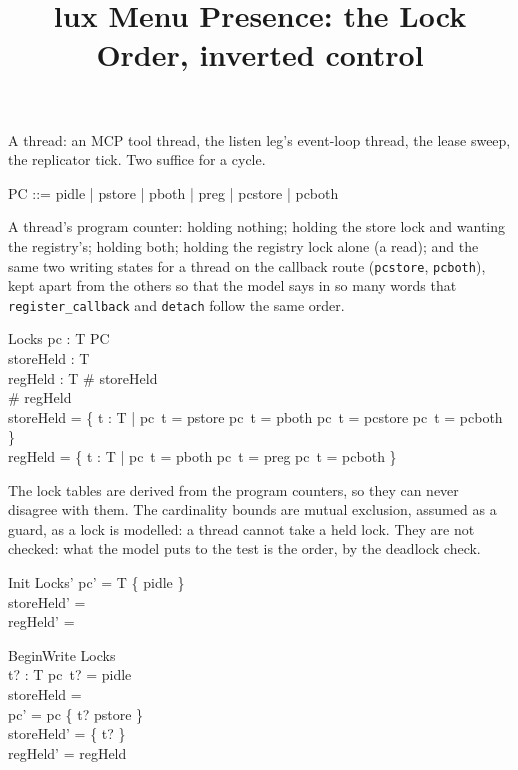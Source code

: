 \documentclass[a4paper,10pt,fleqn]{article}
\begin{document}
\title{lux Menu Presence: the Lock Order, inverted control}
\maketitle

\begin{zed}
  [T]
\end{zed}

A thread: an MCP tool thread, the listen leg's event-loop thread, the lease
sweep, the replicator tick. Two suffice for a cycle.

\begin{zed}
  PC ::= pidle | pstore | pboth | preg | pcstore | pcboth
\end{zed}

A thread's program counter: holding nothing; holding the store lock and
wanting the registry's; holding both; holding the registry lock alone (a
read); and the same two writing states for a thread on the callback route
(\texttt{pcstore}, \texttt{pcboth}), kept apart from the others so that the
model says in so many words that \texttt{register\_callback} and
\texttt{detach} follow the same order.

\begin{schema}{Locks}
  pc : T \fun PC \\
  storeHeld : \power T \\
  regHeld : \power T
\where
  \# storeHeld  \\
  \# regHeld  \\
  storeHeld = \{ t : T | pc~t = pstore \lor pc~t = pboth \lor
    pc~t = pcstore \lor pc~t = pcboth \} \\
  regHeld = \{ t : T | pc~t = pboth \lor pc~t = preg \lor
    pc~t = pcboth \}
\end{schema}

The lock tables are derived from the program counters, so they can never
disagree with them. The cardinality bounds are mutual exclusion, assumed as a
guard, as a lock is modelled: a thread cannot take a held lock. They are not
checked: what the model puts to the test is the order, by the deadlock check.

\begin{schema}{Init}
  Locks'
\where
  pc' = T \cross \{ pidle \} \\
  storeHeld' = \emptyset \\
  regHeld' = \emptyset
\end{schema}

\begin{schema}{BeginWrite}
  \Delta Locks \\
  t? : T
\where
  pc~t? = pidle \\
  storeHeld = \emptyset \\
  pc' = pc \oplus \{ t? \mapsto pstore \} \\
  storeHeld' = \{ t? \} \\
  regHeld' = regHeld
\end{schema}
\end{document}
